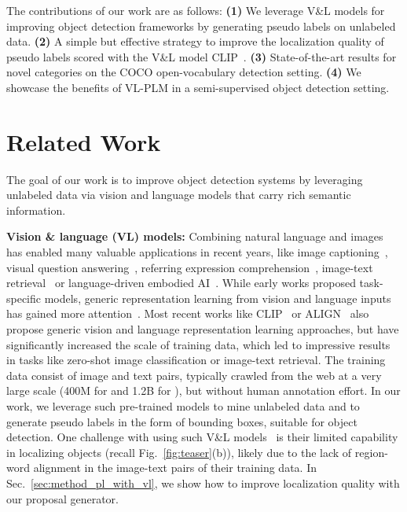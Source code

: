 \documentclass[runningheads]{llncs}
\begin{document}
The contributions of our work are as follows:
\textbf{(1)} We leverage V\&L models for improving object detection frameworks by generating pseudo labels on unlabeled data.
\textbf{(2)} A simple but effective strategy to improve the localization quality of pseudo labels scored with the V\&L model CLIP~\cite{radford_arxiv_2021}.
\textbf{(3)} State-of-the-art results for novel categories on the COCO open-vocabulary detection setting.
\textbf{(4)} We showcase the benefits of VL-PLM in a semi-supervised object detection setting.



\section{Related Work}
\label{sec:related_work}

The goal of our work is to improve object detection systems by leveraging unlabeled data via vision and language models that carry rich semantic information.

\vspace{1mm}
\noindent \textbf{Vision \& language (VL) models:}
Combining natural language and images has enabled many valuable applications in recent years, like image captioning~\cite{agrawal_iccv_19,chen2015microsoft,fang_cvpr_15,karpathy_cvpr_15}, visual question answering~\cite{agrawal_iccv_15,fukui_emnlp_16,hudson_neurips_19,li_eccv_20,peng_cvpr_2019,zhang_cvpr_21}, referring expression comprehension~\cite{Chen_ECCV_20_UNITER,kamath_iccv_21,kazemzadeh_emnlp_14,Lu_neurips_19_ViLBERT,mao_cvpr_16,yu_cvpr_18,yu_eccv_16}, image-text retrieval~\cite{ALBEF,radford_arxiv_2021,wang_cvpr_16} or language-driven embodied AI~\cite{anderson_cvpr_18,das_cvpr_18}.
While early works proposed task-specific models, generic representation learning from vision and language inputs has gained more attention~\cite{Chen_ECCV_20_UNITER,hu_iccv_21_UniT,liu2019roberta,Lu_neurips_19_ViLBERT,Sun_iccv_19_VideoBERT}.
Most recent works like CLIP~\cite{radford_arxiv_2021} or ALIGN~\cite{jia_icml_21} also propose generic vision and language representation learning approaches, but have significantly increased the scale of training data, which led to impressive results in tasks like zero-shot image classification or image-text retrieval. The training data consist of image and text pairs, typically crawled from the web at a very large scale (400M for \cite{radford_arxiv_2021} and 1.2B for \cite{jia_icml_21}), but without human annotation effort.
In our work, we leverage such pre-trained models to mine unlabeled data and to generate pseudo labels in the form of bounding boxes, suitable for object detection.  One challenge with using such V\&L models~\cite{jia_icml_21,radford_arxiv_2021} is their limited capability in localizing objects (recall Fig.~\ref{fig:teaser}(b)), likely due to the lack of region-word alignment in the image-text pairs of their training data.  In Sec.~\ref{sec:method_pl_with_vl}, we show how to improve localization quality with our proposal generator.
\end{document}
